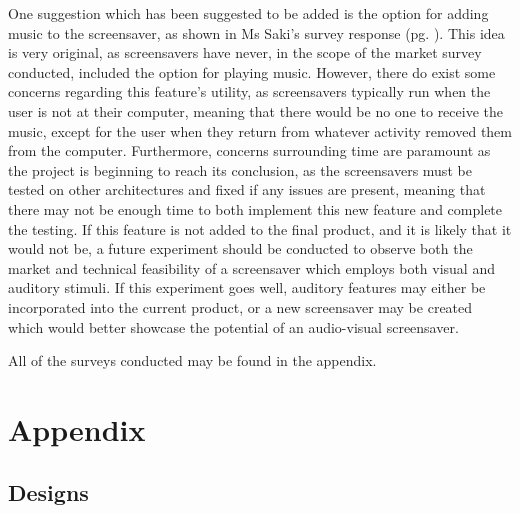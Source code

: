 \documentclass[10pt, openany]{book}
\begin{document}
One suggestion which has been suggested to be added is the option for adding music to the screensaver, as shown in Ms Saki's survey response (pg. \pageref{app:survey-aartee}). This idea is very original, as screensavers have never, in the scope of the market survey conducted, included the option for playing music. However, there do exist some concerns regarding this feature's utility, as screensavers typically run when the user is not at their computer, meaning that there would be no one to receive the music, except for the user when they return from whatever activity removed them from the computer. Furthermore, concerns surrounding time are paramount as the project is beginning to reach its conclusion, as the screensavers must be tested on other architectures and fixed if any issues are present, meaning that there may not be enough time to both implement this new feature and complete the testing. If this feature is not added to the final product, and it is likely that it would not be, a future experiment should be conducted to observe both the market and technical feasibility of a screensaver which employs both visual and auditory stimuli. If this experiment goes well, auditory features may either be incorporated into the current product, or a new screensaver may be created which would better showcase the potential of an audio-visual screensaver.

All of the surveys conducted may be found in the appendix.

\printbibliography[heading=bibintoc,title={Bibliography}]

\printglossaries

\chapter{Appendix}
\section{Designs}
\end{document}
